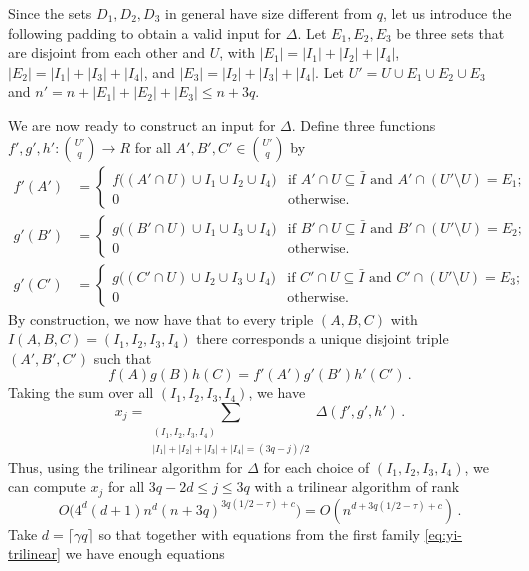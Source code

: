 \documentclass{amsart}
\begin{document}
Since the sets $D_1,D_2,D_3$ in general have size different from
$q$, let us introduce the following padding to obtain a valid input
for $\Delta$. Let $E_1,E_2,E_3$ be three sets that are disjoint from each
other and $U$, with 
$|E_1|=|I_1|+|I_2|+|I_4|$,
$|E_2|=|I_1|+|I_3|+|I_4|$, and
$|E_3|=|I_2|+|I_3|+|I_4|$.
Let $U'=U\cup E_1\cup E_2\cup E_3$ and $n'=n+|E_1|+|E_2|+|E_3|\leq n+3q$.

We are now ready to construct an input for $\Delta$.
Define three functions $f',g',h':\binom{U'}{q}\rightarrow R$ for all 
$A',B',C'\in\binom{U'}{q}$ by 
\[
\begin{split}
f'(A')&=
\begin{cases}
f\bigl((A'\cap U)\cup I_1\cup I_2\cup I_4\bigr) & \text{if $A'\cap U\subseteq\bar I$ and $A'\cap (U'\setminus U)=E_1$;}\\
0           & \text{otherwise.}
\end{cases}\\
g'(B')&=
\begin{cases}
g\bigl((B'\cap U)\cup I_1\cup I_3\cup I_4\bigr) & \text{if $B'\cap U\subseteq\bar I$ and $B'\cap (U'\setminus U)=E_2$;}\\
0           & \text{otherwise.}
\end{cases}\\
g'(C')&=
\begin{cases}
g\bigl((C'\cap U)\cup I_2\cup I_3\cup I_4\bigr) & \text{if $C'\cap U\subseteq\bar I$ and $C'\cap (U'\setminus U)=E_3$;}\\
0           & \text{otherwise.}
\end{cases}
\end{split}
\]
By construction, we now have that to every triple $(A,B,C)$ with 
$I(A,B,C)=(I_1,I_2,I_3,I_4)$ there corresponds a unique disjoint triple 
$(A',B',C')$ such that 
\[
f(A)g(B)h(C)=f'(A')g'(B')h'(C')\,. 
\]
Taking the sum over all $(I_1,I_2,I_3,I_4)$, we have
\[
x_j = 
\sum_{\substack{(I_1,I_2,I_3,I_4)\\|I_1|+|I_2|+|I_3|+|I_4|=(3q-j)/2}}\Delta(f',g',h')\,.
\]
Thus, using the trilinear algorithm for $\Delta$ 
for each choice of $(I_1,I_2,I_3,I_4)$, we can compute 
$x_j$ for all $3q-2d\leq j\leq 3q$ with a trilinear algorithm of rank
\begin{equation}
\label{eq:xj-trilinear}
O\bigl(4^{d}(d+1)n^{d}(n+3q)^{3q(1/2-\tau)+c}\bigr)=O(n^{d+3q(1/2-\tau)+c})\,.
\end{equation}
Take $d=\lceil\gamma q\rceil$ so that together with equations 
from the first family \eqref{eq:yi-trilinear} we have enough equations 
\end{document}
